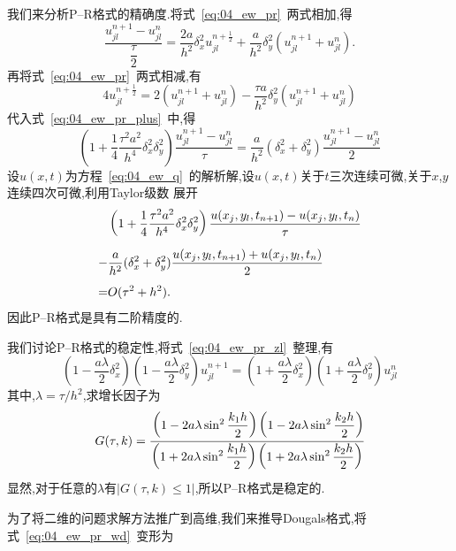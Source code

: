 我们来分析P--R格式的精确度.将式~\eqref{eq:04_ew_pr}~两式相加,得
\begin{equation}\label{eq:04_ew_pr_plus}
\dfrac{u_{jl}^{n+1}-u_{jl}^n}{\dfrac{\tau}{2}}=\dfrac{2a}{h^2}\delta_x^2u_{jl}^{n+\tfrac{1}{2}}
+\dfrac{a}{h^2}\delta_y^2(u_{jl}^{n+1}+u_{jl}^n).
\end{equation}
再将式~\eqref{eq:04_ew_pr}~两式相减,有
\begin{equation}
4u_{jl}^{n+\frac{1}{2}}=2(u_{jl}^{n+1}+u_{jl}^n)-\dfrac{\tau a}{h^2}\delta_y^2(u_{jl}^{n+1}+u_{jl}^n)
\end{equation}
代入式~\eqref{eq:04_ew_pr_plus}~中,得
\begin{equation}\label{eq:04_ew_pr_zl}
\left(1+\dfrac{1}{4}\dfrac{\tau^2 a^2}{h^4}\delta_x^2\delta_y^2\right)\dfrac{u_{jl}^{n+1}-u_{jl}^n}{\tau}
=\dfrac{a}{h^2}(\delta_x^2+\delta_y^2)\dfrac{u_{jl}^{n+1}-u_{jl}^n}{2}
\end{equation}
设$u(x,t)$为方程~\eqref{eq:04_ew_q}~的解析解,设$u(x,t)$关于$t$三次连续可微,关于$x$,$y$连续四次可微,利用Taylor级数
展开
\begin{equation*}
\begin{split}
&\left(1+\dfrac{1}{4}\dfrac{\tau^2 a^2}{h^4}\delta_x^2\delta_y^2\right)\dfrac{u(x_j,y_l,t_{n+1})-
u(x_j,y_l,t_n)}{\tau} \\[0.3\baselineskip]
-& \dfrac{a}{h^2}(\delta_x^2+\delta_y^2)\dfrac{u(x_j,y_l,t_{n+1})+u(x_j,y_l,t_n)}{2} \\[0.3\baselineskip]
=& O(\tau^2+h^2).
\end{split}
\end{equation*}
因此P--R格式是具有二阶精度的.\par
我们讨论P--R格式的稳定性,将式~\eqref{eq:04_ew_pr_zl}~整理,有
\begin{equation}\label{eq:04_ew_pr_wd}
 \left(1-\dfrac{a\lambda}{2}\delta_x^2\right)\left(1-\dfrac{a\lambda}{2}\delta_y^2\right)u_{jl}^{n+1}
 =\left(1+\dfrac{a\lambda}{2}\delta_x^2\right)\left(1+\dfrac{a\lambda}{2}\delta_y^2\right)u_{jl}^n
\end{equation}
其中,$\lambda=\tau/h^2$,求增长因子为
\begin{equation*}
G(\tau,k)=\cfrac{\left(1-2a\lambda\sin^2\dfrac{k_1h}{2}\right)\left(1-2a\lambda\sin^2\dfrac{k_2h}{2}\right)}
{\left(1+2a\lambda\sin^2\dfrac{k_1h}{2}\right)\left(1+2a\lambda\sin^2\dfrac{k_2h}{2}\right)}
\end{equation*}
显然,对于任意的$\lambda$有$|G(\tau,k)\leq 1|$,所以P--R格式是稳定的.\par
为了将二维的问题求解方法推广到高维,我们来推导Dougals格式,将式~\eqref{eq:04_ew_pr_wd}~变形为
